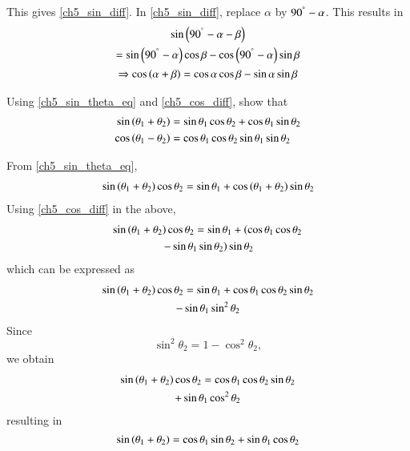 %
This gives \eqref{ch5_sin_diff}.  In \eqref{ch5_sin_diff}, replace $\alpha$ by 
%
$90^{\degree} - \alpha$.  This results in
%
\begin{multline}
\sin\left(90^{\degree} - \alpha - \beta\right)
\\
=
\sin \left(90^{\degree} -\alpha\right) \cos \beta - \cos \left(90^{\degree} -\alpha\right) \sin \beta \\
\Rightarrow \cos\left(\alpha + \beta\right) = \cos \alpha \cos \beta - \sin \alpha \sin \beta
\end{multline}
% 
\begin{problem}
	Using \eqref{ch5_sin_theta_eq} and \eqref{ch5_cos_diff}, show that
\begin{align}
\label{ch5_sin_sum}
\sin\left(\theta_1 + \theta_2\right) &= \sin\theta_1  \cos\theta_2 + \cos\theta_1\sin\theta_2
\\
\cos\left(\theta_1 - \theta_2\right) &= \cos\theta_1  \cos\theta_2  \sin\theta_1\sin\theta_2
\label{ch5_cos_sum}
\end{align}
\end{problem}
%
\proof From \eqref{ch5_sin_theta_eq},
%
\begin{align}
 \sin \left(\theta_1 + \theta_2\right)\cos \theta_2 =\sin  \theta_1 +\cos\left(\theta_1+\theta_2\right)\sin\theta_2 
\end{align}
%
Using \eqref{ch5_cos_diff} in the above,
%
\begin{multline}
\sin \left(\theta_1 + \theta_2\right)\cos \theta_2 
=\sin  \theta_1 +\left(\cos \theta_1\cos\theta_2 \right.
\\	
\left.	- \sin \theta_1\sin\theta_2\right)\sin\theta_2 
\end{multline}
%
which can be expressed as
%
\begin{multline}
\sin \left(\theta_1 + \theta_2\right)\cos \theta_2 
=\sin  \theta_1 +\cos \theta_1\cos\theta_2 \sin\theta_2 
\\	
	- \sin \theta_1\sin^2\theta_2
\end{multline}
%
Since
%
\begin{equation}
\sin^2\theta_2 = 1- \cos^2\theta_2, 
\end{equation}
%
we obtain
%
\begin{multline}
\sin \left(\theta_1 + \theta_2\right)\cos \theta_2 
=\cos \theta_1\cos\theta_2 \sin\theta_2 
\\	
+ \sin \theta_1\cos^2\theta_2
\end{multline}
%
resulting in
%
\begin{equation}
\sin \left(\theta_1 + \theta_2\right)
=\cos \theta_1 \sin\theta_2 
+ \sin \theta_1\cos\theta_2
\end{equation}
